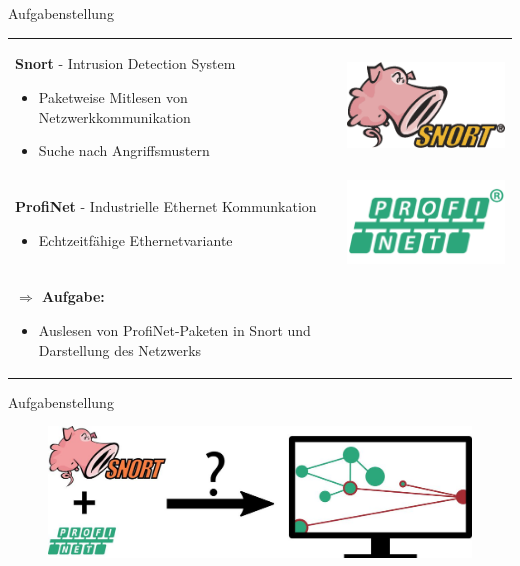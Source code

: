 \begin{frame}{Aufgabenstellung}
\begin{tabular}{m{8cm}r}
  \textbf{Snort} - Intrusion Detection System
    \begin{itemize}
      \item Paketweise Mitlesen von Netzwerkkommunikation
      \item Suche nach Angriffsmustern
    \end{itemize} & \includegraphics[width=0.2\linewidth]{images/max-snort} \\
  \pause
  \textbf{ProfiNet} - Industrielle Ethernet Kommunkation
    \begin{itemize}
      \item Echtzeitfähige Ethernetvariante
    \end{itemize} & \includegraphics[width=0.2\linewidth]{images/max-profinet} \\
  \pause
  \textbf{$\Rightarrow$ Aufgabe:}
  \begin{itemize}
    \item Auslesen von ProfiNet-Paketen in Snort und Darstellung des Netzwerks
\end{itemize}
\end{tabular}
\end{frame}

\begin{frame}{Aufgabenstellung}
\begin{figure}
  \centering
  \includegraphics[width=\textwidth]{./images/aufgabestellung.jpg}
\end{figure}
\end{frame} 